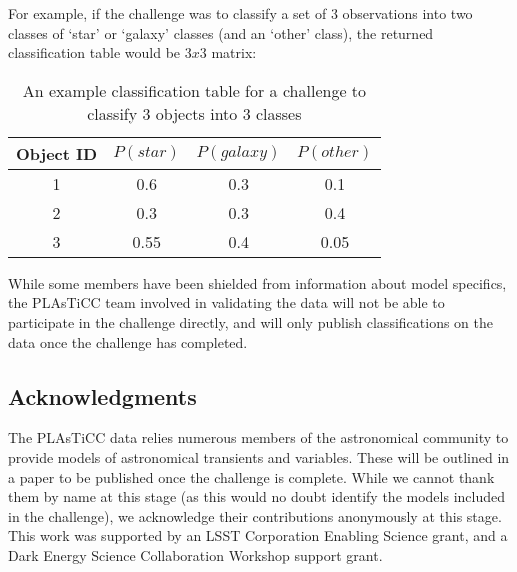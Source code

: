 \documentclass[\docopts]{\docclass}
\begin{document}
For example, if the challenge was to classify a set of 3 observations into two classes of `star' or `galaxy' classes (and an `other' class), the returned classification table would be $3x3$ matrix:

\begin{table}[htbp!]
\begin{center}
\begin{tabular}{|c|c|c|c|}
Object ID & $P(star)$ & $P(galaxy)$ & $P(other)$ \\
\hline
1 & 0.6 & 0.3 & 0.1\\
2 & 0.3 & 0.3 & 0.4\\
3 & 0.55 & 0.4 & 0.05\\
\end{tabular}
\caption{An example classification table for a challenge to classify 3 objects into 3 classes}
\end{center}
\end{table}

While some members have been shielded from information about model specifics, the PLAsTiCC team involved in validating the data will not be able to participate in the challenge directly, and will only publish classifications on the data once the challenge has completed.


\subsection{Acknowledgments}
The PLAsTiCC data relies numerous members of the astronomical community to provide models of astronomical transients and variables. These will be outlined in a paper to be published once the challenge is complete. While we cannot thank them by name at this stage (as this would no doubt identify the models included in the challenge), we acknowledge their contributions anonymously at this stage. This work was supported by an LSST Corporation Enabling Science grant, and a Dark Energy Science Collaboration Workshop support grant.



\end{document}
